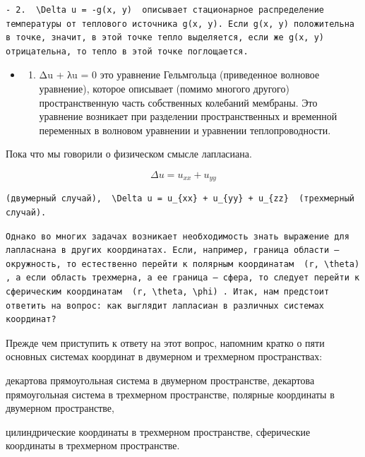 \documentclass[
  ukrainian,
]{article}
\providecommand{\tightlist}{%
  \setlength{\itemsep}{0pt}\setlength{\parskip}{0pt}}
\begin{document}
\begin{verbatim}
- 2.  \Delta u = -g(x, y)  описывает стационарное распределение температуры от теплового источника g(x, y). Если g(x, y) положительна в точке, значит, в этой точке тепло выделяется, если же g(x, y) отрицательна, то тепло в этой точке поглощается.
\end{verbatim}

\begin{itemize}
\tightlist
\item
  \begin{enumerate}
  \def\labelenumi{\arabic{enumi}.}
  \setcounter{enumi}{2}
  \tightlist
  \item
    Δu + λu = 0 это уравнение Гельмгольца (приведенное волновое
    уравнение), которое описывает (помимо многого другого)
    пространственную часть собственных колебаний мембраны. Это уравнение
    возникает при разделении пространственных и временной переменных в
    волновом уравнении и уравнении теплопроводности.
  \end{enumerate}
\end{itemize}

Пока что мы говорили о физическом смысле лапласиана.

\[
\Delta u = u_{xx} + u_{yy}
\]

\begin{verbatim}
(двумерный случай),  \Delta u = u_{xx} + u_{yy} + u_{zz}  (трехмерный случай).
\end{verbatim}

\begin{verbatim}
Однако во многих задачах возникает необходимость знать выражение для лапласнана в других координатах. Если, например, граница области — окружность, то естественно перейти к полярным координатам  (r, \theta) , а если область трехмерна, а ее граница — сфера, то следует перейти к сферическим координатам  (r, \theta, \phi) . Итак, нам предстоит ответить на вопрос: как выглядит лапласиан в различных системах координат?
\end{verbatim}

Прежде чем приступить к ответу на этот вопрос, напомним кратко о пяти
основных системах координат в двумерном и трехмерном пространствах:

декартова прямоугольная система в двумерном пространстве, декартова
прямоугольная система в трехмерном пространстве, полярные координаты в
двумерном пространстве,

цилиндрические координаты в трехмерном пространстве, сферические
координаты в трехмерном пространстве.
\end{document}
